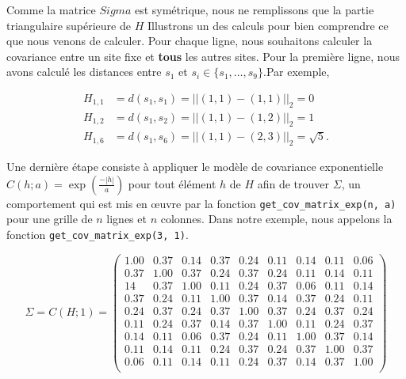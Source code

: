 \documentclass[10pt]{article} %
\begin{document}

Comme la matrice $Sigma $ est symétrique, nous ne remplissons que la partie triangulaire supérieure de $H$ Illustrons
un des calculs pour bien comprendre ce que nous venons de calculer. Pour chaque ligne, nous souhaitons calculer la covariance
entre un site fixe et \textbf{tous} les autres sites. Pour la première ligne, nous avons calculé les distances entre
$s_1$ et $s_i \in \{s_1, \dots, s_9\}$.Par exemple,


\begin{align*}
    H_{1, 1} &= d(s_1, s_1) = ||(1, 1) - (1, 1)||_2 = 0 \\
    H_{1, 2} &= d(s_1, s_2) = ||(1, 1) - (1, 2)||_2 = 1 \\
    H_{1, 6} &= d(s_1, s_6) = ||(1, 1) - (2, 3)||_2 = \sqrt{5}.
\end{align*}


Une dernière étape consiste à appliquer le modèle de covariance exponentielle $C(h ; a) = \exp(\frac{-|h|}{a})$ pour
tout élément $h$ de $H$ afin de trouver $\Sigma$, un comportement qui est mis en œuvre par la fonction \texttt{get\_cov\_matrix\_exp(n, a)}
pour une grille de $n$ lignes et $n$ colonnes. Dans notre exemple, nous appelons la fonction \texttt{get\_cov\_matrix\_exp(3, 1)}.


$$
\Sigma = C(H; 1) =
\begin{pmatrix}
    1.00 & 0.37 & 0.14 & 0.37 & 0.24 & 0.11 & 0.14 & 0.11 & 0.06 \\
    0.37 & 1.00 & 0.37 & 0.24 & 0.37 & 0.24 & 0.11 & 0.14 & 0.11 \\
    14 & 0.37 & 1.00 & 0.11 & 0.24 & 0.37 & 0.06 & 0.11 & 0.14 \\
    0.37 & 0.24 & 0.11 & 1.00 & 0.37 & 0.14 & 0.37 & 0.24 & 0.11 \\
    0.24 & 0.37 & 0.24 & 0.37 & 1.00 & 0.37 & 0.24 & 0.37 & 0.24 \\
    0.11 & 0.24 & 0.37 & 0.14 & 0.37 & 1.00 & 0.11 & 0.24 & 0.37 \\
    0.14 & 0.11 & 0.06 & 0.37 & 0.24 & 0.11 & 1.00 & 0.37 & 0.14 \\
    0.11 & 0.14 & 0.11 & 0.24 & 0.37 & 0.24 & 0.37 & 1.00 & 0.37 \\
    0.06 & 0.11 & 0.14 & 0.11 & 0.24 & 0.37 & 0.14 & 0.37 & 1.00 \\
\end{pmatrix}
$$
\end{document}
